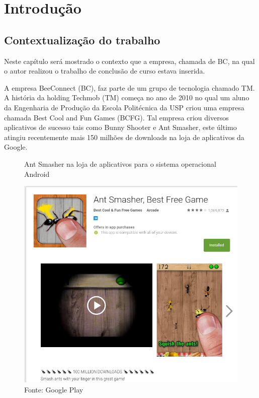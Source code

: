 \chapter[Introdução]{Introdução}
\label{chap:introducao}
\section{Contextualização do trabalho}
\label{cha:contexto}

Neste capítulo será mostrado o contexto que a empresa, chamada de BC, na qual o autor realizou o trabalho de conclusão de curso estava inserida.

A empresa BeeConnect (BC), faz parte de um grupo de tecnologia chamado TM. A história da holding Techmob (TM) começa no ano de 2010 no qual um aluno da Engenharia de Produção da Escola Politécnica da USP criou uma empresa chamada Best Cool and Fun Games (BCFG). Tal empresa criou diversos aplicativos de sucesso tais como Bunny Shooter e Ant Smasher, este último atingiu recentemente mais 150 milhões de downloads na loja de aplicativos da Google. 

\begin{figure}[H]
\caption{Ant Smasher na loja de aplicativos para o sistema operacional Android}
\centerline{\includegraphics[scale=0.5]{img/antsmasherGooglePlay}}
\label{fig:antsmasherGooglePlay}
\caption* {Fonte: Google Play}
\end{figure}

